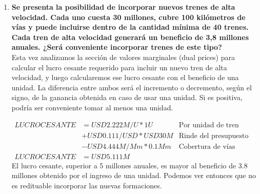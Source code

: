 \documentclass[10pt, a4paper, titlepage,
	oneside,
	fleqn, leqno]{article}
\begin{document}
\begin{enumerate} [a .]
	Empecemos por el presupuesto:
\begin{align*}
	PRESUPUESTO_{TRENES}	&= USD20M/U * 50U\\
	PRESUPUESTO_{TRENES}	&= USD1000M\\
	PRESUPUESTO_{VIAS}	&= PRESUPUESTO - PRESUPUESTO_{TRENES}\\
		&= USD1000M - USD1000M\\
	PRESUPUESTO_{VIAS}	&=0\\
\end{align*}
Vemos que sólamente hay presupuesto para la compra de trenes, y no se compran nuevas vías.

	Ahora analizamos la cobertura:
\begin{align*}
	VIASCUBIERTAS_b	&= min(48Mm, 1050U * 0.05Mm/U)\\
		&= min(48Mm, 52.5Mm)\\
	VIASCUBIERTAS_b	&= 48Mm
\end{align*}
Vemos que se cubre completamente la infraestructura vial actual.

	Ahora analicemos los ingresos:
\begin{align*}
	INGRESOS_b	&= USD2M/U * 1050U + USD10M/Mm * 48Mm\\
		&= USD2100M + USD480M\\
	INGRESOS_b	&= USD2580M
\end{align*}
Vemos que la solución de 2580 millones de USD es, efectivamente, peor que la original de 2600 millones de USD.

\item \textbf{Se presenta la posibilidad de incorporar nuevos trenes de alta velocidad. Cada uno cuesta 30 millones, cubre 100 kilómetros de vías y puede incluirse dentro de la cantidad mínima de 40 trenes. Cada tren de alta velocidad generará un beneficio de 3,8 millones anuales. ¿Será conveniente incorporar trenes de este tipo?}\\
	Esta vez analizamos la sección de valores marginales (dual prices) para calcular el lucro cesante requerido para incluir un nuevo tren de alta velocidad, y luego calcularemos ese lucro cesante con el beneficio de una unidad.
La diferencia entre ambos será el incremento o decremento, según el signo, de la ganancia obtenida en caso de usar una unidad.
Si es positiva, podría ser conveniente tomar al menos una unidad.

\begin{align*}
	LUCROCESANTE	&= USD2.222M/U * 1U &\text{Por unidad de tren reemplazada}\\
					& + USD0.111/USD * USD30M &\text{Rinde del presupuesto}\\
					& - USD4.444M/Mm * 0.1Mm &\text{Cobertura de vías}\\
	LUCROCESANTE	&= USD5.111M
\end{align*}
El lucro cesante, superior a 5 millones anuales, es mayor al beneficio de 3.8 millones obtenido por el ingreso de una unidad.
Podemos ver entonces que no es redituable incorporar las nuevas formaciones.

\end{enumerate}

\appendix

\end{document}
